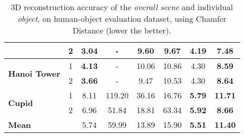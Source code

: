 \begin{table}[t]
{\begin{tabular}{|l|c|cc|cc|cc|}
                                       & 2               & \multicolumn{1}{c|}{\textbf{3.04}}          & -               & \multicolumn{1}{c|}{9.60}                   & 9.67            & \multicolumn{1}{c|}{4.19}                   & \textbf{7.48}   \\ \hline
\multirow{2}{*}{\textbf{Hanoi Tower}}  & 1               & \multicolumn{1}{c|}{\textbf{4.13}}          & -               & \multicolumn{1}{c|}{10.06}                  & 10.86           & \multicolumn{1}{c|}{4.30}                   & \textbf{8.59}   \\ \cline{2-8} 
                                       & 2               & \multicolumn{1}{c|}{\textbf{3.66}}          & -               & \multicolumn{1}{c|}{9.47}                   & 10.53           & \multicolumn{1}{c|}{4.30}                   & \textbf{8.64}   \\ \hline
\multirow{2}{*}{\textbf{Cupid}}        & 1               & \multicolumn{1}{c|}{8.11}                   & 119.20          & \multicolumn{1}{c|}{36.16}                  & 16.76           & \multicolumn{1}{c|}{\textbf{5.79}}          & \textbf{11.71}  \\ \cline{2-8} 
                                       & 2               & \multicolumn{1}{c|}{6.96}                   & 51.84           & \multicolumn{1}{c|}{18.81}                  & 63.34           & \multicolumn{1}{c|}{\textbf{5.92}}          & \textbf{8.66}   \\ \hline\hline
\textbf{Mean}        &                & \multicolumn{1}{c|}{5.74}                   & 59.99          & \multicolumn{1}{c|}{13.89}                  & 15.90           & \multicolumn{1}{c|}{\textbf{5.51}}          & \textbf{11.40} \\ \hline
\end{tabular}
}
    \caption{
    3D reconstruction accuracy of the \textit{overall scene} and individual \textit{object}, on human-object evaluation dataset, using Chamfer Distance (lower the better).
    }
    \label{table:human_object_geometric}
\end{table}



